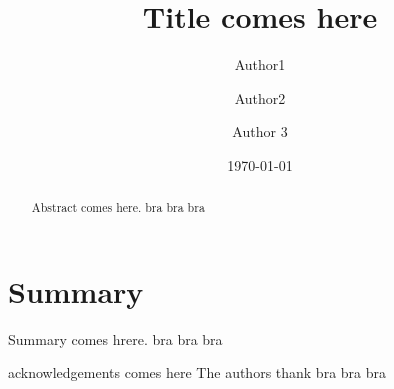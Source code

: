 \documentclass[jsarticle]{revtex4-1}
\begin{document}
\title{
Title comes here
}

\author{Author1}

\author{Author2}

\author{Author 3}

\date{\today}

\begin{abstract}
  Abstract comes here. bra bra bra
\end{abstract}

\maketitle

%
%
%

%


\section{Summary}
  Summary comes hrere. bra bra bra


\begin{acknowledgements}
  acknowledgements comes here
  The authors thank bra bra bra

\end{acknowledgements}




\end{document}
